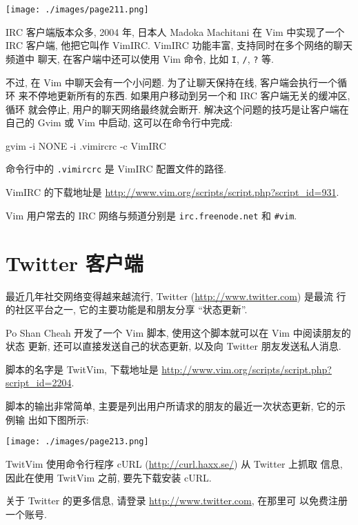 \begin{center}
	\texttt{[image: ./images/page211.png]}
\end{center}

IRC 客户端版本众多, 2004 年, 日本人 Madoka Machitani 在 Vim 中实现了一个 IRC
客户端, 他把它叫作 VimIRC. VimIRC 功能丰富, 支持同时在多个网络的聊天频道中
聊天, 在客户端中还可以使用 Vim 命令, 比如 \texttt{I}, \texttt{/},
\texttt{?} 等.

不过, 在 Vim 中聊天会有一个小问题. 为了让聊天保持在线, 客户端会执行一个循环
来不停地更新所有的东西. 如果用户移动到另一个和 IRC 客户端无关的缓冲区, 循环
就会停止, 用户的聊天网络最终就会断开. 解决这个问题的技巧是让客户端在自己的
Gvim 或 Vim 中启动, 这可以在命令行中完成:
\begin{vimcode}
gvim -i NONE -i .vimircrc -c VimIRC
\end{vimcode}
命令行中的 \texttt{.vimircrc} 是 VimIRC 配置文件的路径.

VimIRC 的下载地址是 \url{http://www.vim.org/scripts/script.php?script_id=931}.

\begin{warning}
    Vim 用户常去的 IRC 网络与频道分别是 \texttt{irc.freenode.net} 和
    \texttt{\#vim}.
\end{warning}

\section{Twitter 客户端}
\label{sec:using_vim_as_a_twitter_client}

最近几年社交网络变得越来越流行, Twitter (\url{http://www.twitter.com}) 是最流
行的社区平台之一, 它的主要功能是和朋友分享 ``状态更新''.

Po Shan Cheah 开发了一个 Vim 脚本, 使用这个脚本就可以在 Vim 中阅读朋友的状态
更新, 还可以直接发送自己的状态更新, 以及向 Twitter 朋友发送私人消息.

脚本的名字是 TwitVim, 下载地址是
\url{http://www.vim.org/scripts/script.php?script_id=2204}.

脚本的输出非常简单, 主要是列出用户所请求的朋友的最近一次状态更新, 它的示例输
出如下图所示:
\begin{center}
    \texttt{[image: ./images/page213.png]}
\end{center}

TwitVim 使用命令行程序 cURL (\url{http://curl.haxx.se/}) 从 Twitter 上抓取
信息, 因此在使用 TwitVim 之前, 要先下载安装 cURL.

\begin{warning}
    关于 Twitter 的更多信息, 请登录 \url{http://www.twitter.com}, 在那里可
    以免费注册一个账号.
\end{warning}

